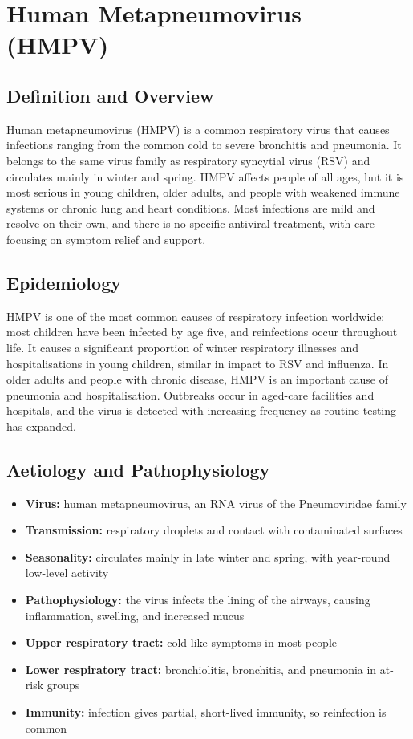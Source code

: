 \chapter{Human Metapneumovirus (HMPV)}

\section*{Definition and Overview}
Human metapneumovirus (HMPV) is a common respiratory virus that causes infections ranging from the common cold to severe bronchitis and pneumonia. It belongs to the same virus family as respiratory syncytial virus (RSV) and circulates mainly in winter and spring. HMPV affects people of all ages, but it is most serious in young children, older adults, and people with weakened immune systems or chronic lung and heart conditions. Most infections are mild and resolve on their own, and there is no specific antiviral treatment, with care focusing on symptom relief and support.

\section*{Epidemiology}
HMPV is one of the most common causes of respiratory infection worldwide; most children have been infected by age five, and reinfections occur throughout life. It causes a significant proportion of winter respiratory illnesses and hospitalisations in young children, similar in impact to RSV and influenza. In older adults and people with chronic disease, HMPV is an important cause of pneumonia and hospitalisation. Outbreaks occur in aged-care facilities and hospitals, and the virus is detected with increasing frequency as routine testing has expanded.

\section*{Aetiology and Pathophysiology}
\begin{itemize}
    \item \textbf{Virus:} human metapneumovirus, an RNA virus of the Pneumoviridae family
    \item \textbf{Transmission:} respiratory droplets and contact with contaminated surfaces
    \item \textbf{Seasonality:} circulates mainly in late winter and spring, with year-round low-level activity
    \item \textbf{Pathophysiology:} the virus infects the lining of the airways, causing inflammation, swelling, and increased mucus
    \item \textbf{Upper respiratory tract:} cold-like symptoms in most people
    \item \textbf{Lower respiratory tract:} bronchiolitis, bronchitis, and pneumonia in at-risk groups
    \item \textbf{Immunity:} infection gives partial, short-lived immunity, so reinfection is common
\end{itemize}

